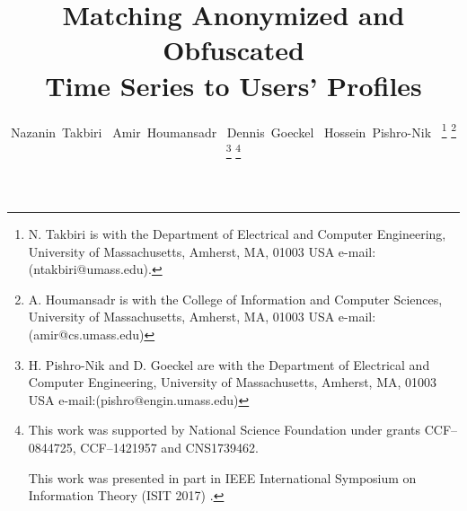 \documentclass[journal,12pt,draftclsnofoot, onecolumn]{IEEEtran}
\theoremstyle{definition}
\begin{document}
%
\title{Matching Anonymized and Obfuscated\\ Time Series to Users' Profiles}

\author{Nazanin~Takbiri~
        Amir~Houmansadr~
        Dennis~Goeckel~
        Hossein~Pishro-Nik~
        \thanks{N. Takbiri is with the Department
        of Electrical and Computer Engineering, University of Massachusetts, Amherst,
        MA, 01003 USA e-mail: (ntakbiri@umass.edu).}%
        \thanks{A. Houmansadr is with the College of Information and Computer Sciences, University of Massachusetts, Amherst,
        MA, 01003 USA e-mail:(amir@cs.umass.edu)}
        \thanks{H. Pishro-Nik and D. Goeckel are with the Department
        of Electrical and Computer Engineering, University of Massachusetts, Amherst,
        MA, 01003 USA e-mail:(pishro@engin.umass.edu)}
        \thanks{This work was supported by National Science Foundation under grants CCF--0844725, CCF--1421957 and CNS1739462. 
        
        This work was presented in part in IEEE International Symposium on Information Theory (ISIT 2017) \cite{nazanin_ISIT2017}.}}

\maketitle
\end{document}
